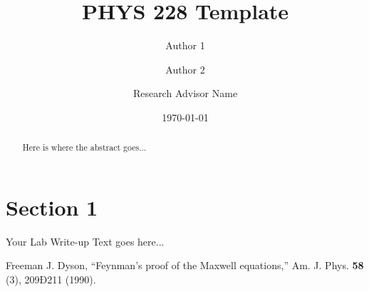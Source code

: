 \documentclass[aps,onecolumn,12pt,letterpaper,amsmath,amssymb,floatfix,pra,notitlepage]{revtex4-1}
\begin{document}
  \setcounter{page}{1}


\title{PHYS 228 Template}

\author{Author 1}
\author{Author 2}
\author{Research Advisor Name}


\date{\today}


\begin{abstract}
Here is where the abstract goes...
\end{abstract}

\maketitle

%
%

\section{Section 1}

Your Lab Write-up Text goes here...

\begin{thebibliography}{}


  Freeman J. Dyson, ``Feynman's proof of the Maxwell equations,'' Am. J. Phys. {\bf 58} (3), 209Ð211 (1990).

\end{thebibliography}
\end{document}
